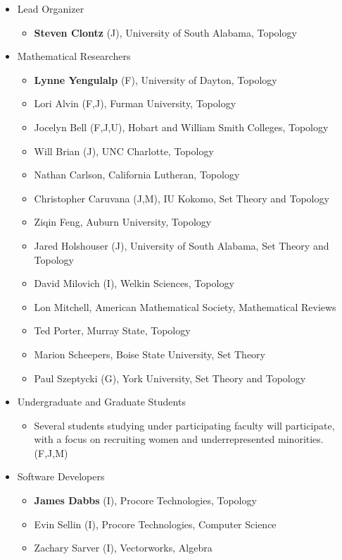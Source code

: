 \documentclass{amsart}
\newcommand{\TODO}[1]{\textcolor{red}{(TODO: #1)}}
\begin{document}
\begin{itemize}
    \item Lead Organizer
    \begin{itemize}
        \item \textbf{Steven Clontz} (J), University of South Alabama, Topology
    \end{itemize}
    \item Mathematical Researchers
    \begin{itemize}
        \item \textbf{Lynne Yengulalp} (F), University of Dayton, Topology
        \item Lori Alvin (F,J), Furman University, Topology
        \item Jocelyn Bell (F,J,U), Hobart and William Smith Colleges, Topology
        \item Will Brian (J), UNC Charlotte, Topology
        \item Nathan Carlson, California Lutheran, Topology
        \item Christopher Caruvana (J,M), IU Kokomo, Set Theory and Topology
        \item Ziqin Feng, Auburn University, Topology
        \item Jared Holshouser (J), University of South Alabama, Set Theory and Topology
        \item David Milovich (I), Welkin Sciences, Topology
        \item Lon Mitchell, American Mathematical Society, Mathematical Reviews
        \item Ted Porter, Murray State, Topology
        \item Marion Scheepers, Boise State University, Set Theory
        \item Paul Szeptycki (G), York University, Set Theory and Topology
    \end{itemize}
    \item Undergraduate and Graduate Students
    \begin{itemize}
        \item Several students studying under participating faculty will participate,
          with a focus on recruiting women and underrepresented minorities. (F,J,M)
    \end{itemize}
    \item Software Developers 
    \begin{itemize}
        \item \textbf{James Dabbs} (I), Procore Technologies, Topology
        \item Evin Sellin (I), Procore Technologies, Computer Science
        \item Zachary Sarver (I), Vectorworks, Algebra
    \end{itemize}
\end{itemize}

{}

\end{document}
